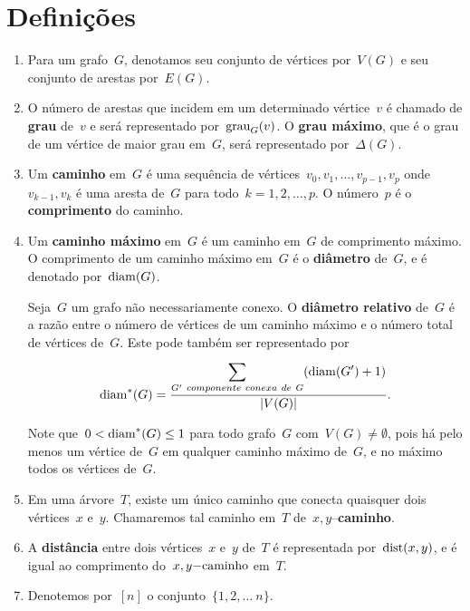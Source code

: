 \section{Definições}
	
\begin{enumerate}
	\item
	Para um grafo~$G$, denotamos seu
	conjunto de vértices por~$V(G)$ e seu
	conjunto de arestas por~$E(G)$.

	\item
	O número de arestas que incidem em um 
	determinado vértice~$v$ é chamado de 
	\textbf{grau} de~$v$ e será representado
	por~$\mathrm{grau}_G(v)$. O 
	\textbf{grau máximo}, que é o grau de um vértice de
	maior grau em~$G$, será representado por~$\Delta(G)$.

	\item
	Um \textbf{caminho} em~$G$ é uma sequência de 
	vértices~$v_0, v_1, \ldots,v_{p-1}, v_p$ 
	onde~$v_{k-1}, v_k$ é uma aresta de~$G$ para 
	todo~${k =1,2, \ldots, p}$. 
	O número~$p$ é o \textbf{comprimento} do caminho.

	\item
	Um \textbf{caminho máximo} em~$G$ é um caminho 
	em~$G$ de comprimento máximo.
	O comprimento de um caminho máximo em~$G$
	é o \textbf{diâmetro} de~$G$, e é denotado por~$\mathrm{diam}(G)$.



	Seja~$G$ um grafo não necessariamente conexo.
	O \textbf{diâmetro relativo} de~$G$
	 é a razão entre o número
	de vértices de um caminho máximo e o número total de vértices
	de~$G$. Este pode também ser representado por
	$$ \mathrm{diam}^*(G) =\dfrac{\displaystyle\sum_{
	G'~componente~conexa~de~G}^{}(\mathrm{diam}(G')+1)}{|V(G)|}.$$

	Note que~${0<\mathrm{diam}^*(G)\le 1}$ para todo grafo~$G$ 
	com~${V(G)\ne \emptyset}$, pois há pelo menos um vértice 
	de~$G$ em qualquer caminho máximo de~$G$, e no máximo 
	todos os vértices de~$G$.

	\item
	Em uma árvore~$T$, existe um único caminho que conecta 
	quaisquer dois vértices~$x$ e~$y$. 
	Chamaremos tal caminho em~$T$ de~$x,y$--\textbf{caminho}.

	\item
	A \textbf{distância} entre dois vértices~$x$ e~$y$ de~$T$ é 
	representada por~$\mathrm{dist}(x,y)$, e é igual ao comprimento 
	do~$x,y\mathrm{-caminho}$ em~$T$.

	\item
	Denotemos por~$[n]$
	o conjunto~$\{1,2,\ldots~n\}$.

\end{enumerate}